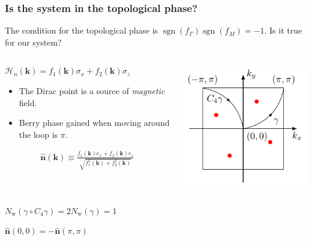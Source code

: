 \documentclass{beamer}
\DeclareMathOperator{\sgn}{sgn}
\newcommand{\mc}{\mathcal}
\renewcommand{\(}{\left(}
\renewcommand{\)}{\right)}
\renewcommand{\[}{\left[}
\renewcommand{\]}{\right]}
\begin{document}
\begin{frame}
    \frametitle{Is the system in the topological phase?}
    The condition for the topological phase is $\sgn(f_\Gamma)\sgn(f_M) = -1$. Is it true for our system? 
    \begin{columns}[]
        \begin{column}{0.5\textwidth}
            \vspace{5pt}

            $\mc H_n(\bm k) = f_1(\bm k) \sigma_x + f_2(\bm k) \sigma_z$
            \hspace{1pt} 
            \begin{itemize}
                \item The Dirac point is a source of \emph{magnetic} field.
                \item Berry phase gained when moving around the loop is $\pi$.
            \end{itemize}
            \begin{align*}
                \hat{\bm n}(\bm k) \equiv \frac{f_1(\bm k) e_x + f_2(\bm k) e_z}{\sqrt{f_1^2(\bm k) + f^2_2(\bm k)}}
            \end{align*}
        \end{column}
        \begin{column}{0.5\textwidth}
            \centering
            \includegraphics[]{BZ_path.pdf}
        \end{column}
    \end{columns}
    \begin{framed}
        \centering
        $N_\text{w} (\gamma \circ C_4 \gamma) = 2N_{\text{w}}(\gamma) = 1$

        $\hat{\bm n}(0,0) = -\hat{\bm n}(\pi, \pi)$
    \end{framed}
\end{frame}
\end{document}

